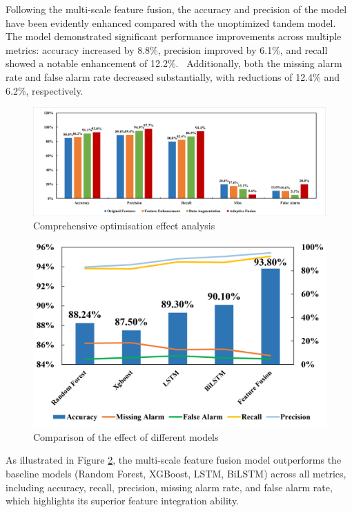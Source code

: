\documentclass[journal,article,submit,pdftex,moreauthors]{Definitions/mdpi}
\begin{document}
Following the multi-scale feature fusion, the accuracy and precision of the model have been evidently enhanced compared with the unoptimized tandem model.   The model demonstrated significant performance improvements across multiple metrics: accuracy increased by 8.8\%, precision improved by 6.1\%, and recall showed a notable enhancement of 12.2\%.  Additionally, both the missing alarm rate and false alarm rate decreased substantially, with reductions of 12.4\% and 6.2\%, respectively.

\begin{figure}[H]
    \centering
    \includegraphics[width=1\linewidth,height=0.27\textheight]{图片/综合图像.png}
    \caption{Comprehensive optimisation effect analysis}
    \label{fig:Comprehensive optimisation effect analysis}
\end{figure}

\begin{figure}[H]
    \centering
    \includegraphics[width=0.75\linewidth]{图片/对比效果.png}
    \caption{Comparison of the effect of different models}
    \label{fig:Comparison of the effect of different models}
\end{figure}

As illustrated in Figure \ref{fig:Comparison of the effect of different models}, the multi-scale feature fusion model outperforms the baseline models (Random Forest, XGBoost, LSTM, BiLSTM) across all metrics, including accuracy, recall, precision, missing alarm rate, and false alarm rate, which highlights its superior feature integration ability.
\end{document}
